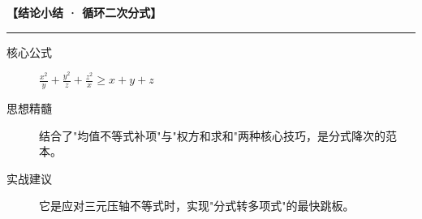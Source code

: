 \begin{summarybox}
\textbf{【结论小结 · 循环二次分式】}
\vspace{0.8em}
\hrule
\vspace{0.8em}

\begin{description}
    \item[核心公式] $\frac{x^2}{y} + \frac{y^2}{z} + \frac{z^2}{x} \geqslant x+y+z$
    \item[思想精髓] 结合了"均值不等式补项"与"权方和求和"两种核心技巧，是分式降次的范本。
    \item[实战建议] 它是应对三元压轴不等式时，实现"分式转多项式"的最快跳板。
\end{description}
\end{summarybox}